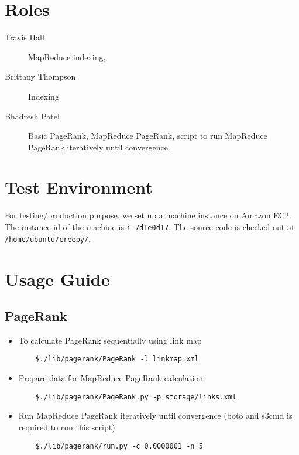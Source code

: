 \documentclass[letterpaper,11pt,twoside]{article}
\begin{document}
\section{Roles}
\begin{description}
 \item[Travis Hall] MapReduce indexing,
 \item[Brittany Thompson] Indexing
 \item[Bhadresh Patel] Basic PageRank, MapReduce PageRank, script to run MapReduce PageRank iteratively until convergence.
\end{description}

\section{Test Environment}
For testing/production purpose, we set up a machine instance on Amazon EC2. The instance id of the machine is \texttt{i-7d1e0d17}. The source code is checked out at \texttt{/home/ubuntu/creepy/}.

\section{Usage Guide}

\subsection{PageRank}
\begin{itemize}
	\item To calculate PageRank sequentially using link map
\begin{verbatim}
	$./lib/pagerank/PageRank -l linkmap.xml
\end{verbatim}

	\item Prepare data for MapReduce PageRank calculation
\begin{verbatim}
	$./lib/pagerank/PageRank.py -p storage/links.xml
\end{verbatim}
	
	\item Run MapReduce PageRank iteratively until convergence (boto and s3cmd is required to run this script)
\begin{verbatim}
	$./lib/pagerank/run.py -c 0.0000001 -n 5
\end{verbatim}
\end{itemize}

\end{document}
